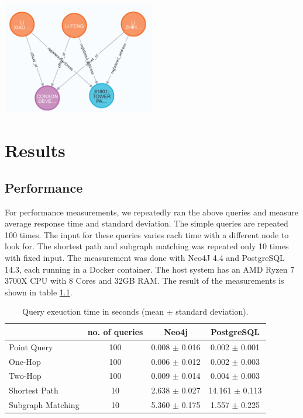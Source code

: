 \documentclass[11pt, a4paper,oneside,chapterprefix=false]{scrbook}
\begin{document}
\begin{center}
\includegraphics*[width=0.5\textwidth]{figures/query_relation.png}
\end{center}

\chapter{Results} \label{chp:results}

\section{Performance}

For performance measurements, we repeatedly ran the above queries and measure average response time and standard deviation.
The simple queries are repeated 100 times.
The input for these queries varies each time with a different node to look for.
The shortest path and subgraph matching was repeated only 10 times with fixed input.
The measurement was done with Neo4J 4.4 and PostgreSQL 14.3, each running in a Docker container.
The host system has an AMD Ryzen 7 3700X CPU with 8 Cores and 32GB RAM.
The result of the measurements is shown in table \ref{table:performance}.

\begin{table}[h]
	\begin{center}
		\begin{tabular}{ |l|c|c|c| }
			\hline
			& no. of queries & Neo4j & PostgreSQL \\
			\hline
			Point Query & 100 & 0.008 $\pm$ 0.016 & 0.002 $\pm$ 0.001 \\
			One-Hop & 100 & 0.006 $\pm$ 0.012 &  0.002 $\pm$ 0.003 \\
			Two-Hop & 100 & 0.009 $\pm$ 0.014 &  0.004 $\pm$ 0.003 \\
			Shortest Path & 10 & 2.638 $\pm$ 0.027 & 14.161 $\pm$ 0.113 \\
			Subgraph Matching & 10 & 5.360 $\pm$ 0.175 & 1.557 $\pm$ 0.225 \\
			\hline
		\end{tabular}
		\caption{\label{table:performance} Query exeuction time in seconds (mean $\pm$ standard deviation).}
	\end{center}
\end{table}
\end{document}
